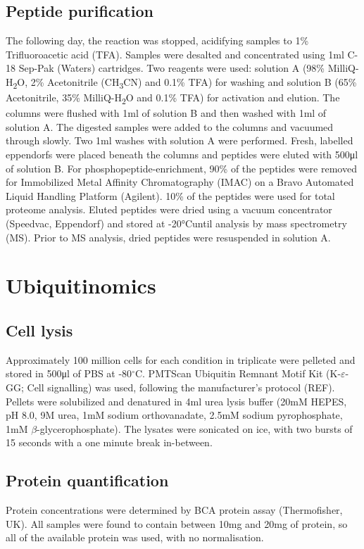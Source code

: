 \subsection{Peptide purification}
The following day, the reaction was stopped, acidifying samples to 1\% Trifluoroacetic acid (TFA).
Samples were desalted and concentrated using 1ml C-18 Sep-Pak (Waters) cartridges.
Two reagents were used: solution A (98\% MilliQ-H\textsubscript{2}O, 2\% Acetonitrile (CH\textsubscript{3}CN) and 0.1\% TFA) for washing and solution B (65\% Acetonitrile, 35\% MilliQ-H\textsubscript{2}O and 0.1\% TFA) for activation and elution.
The columns were flushed with 1ml of solution B and then washed with 1\si{\ml} of solution A.
The digested samples were added to the columns and vacuumed through slowly.
Two 1\si{\ml} washes with solution A were performed.
Fresh, labelled eppendorfs were placed beneath the columns and peptides were eluted with 500\si{\ul} of solution B.
For phosphopeptide-enrichment, 90\% of the peptides were removed for Immobilized Metal Affinity Chromatography (IMAC) on a Bravo Automated Liquid Handling Platform (Agilent). 10\% of the peptides were used for total proteome analysis.
Eluted peptides were dried using a vacuum concentrator (Speedvac, Eppendorf) and stored at -20\si{\degreeCelsius}until analysis by mass spectrometry (MS). Prior to MS analysis, dried peptides were resuspended in solution A.


\section{Ubiquitinomics}
\subsection{Cell lysis}
Approximately 100 million cells for each condition in triplicate were pelleted and stored in 500\si{\ul} of PBS at -80$^{\circ}$C. PMTScan Ubiquitin Remnant Motif Kit (K-$\varepsilon$-GG; Cell signalling) was used, following the manufacturer's protocol (REF).
Pellets were solubilized and denatured in 4\si{\ml} urea lysis buffer (20mM HEPES, pH 8.0, 9M urea, 1mM sodium orthovanadate, 2.5mM sodium pyrophosphate, 1mM $\beta$-glycerophosphate). The lysates were sonicated on ice, with two bursts of 15 seconds with a one minute break in-between.

\subsection{Protein quantification}
Protein concentrations were determined by BCA protein assay (Thermofisher, UK). All samples were found to contain between 10\si{\mg} and 20\si{\mg} of protein, so all of the available protein was used, with no normalisation.

